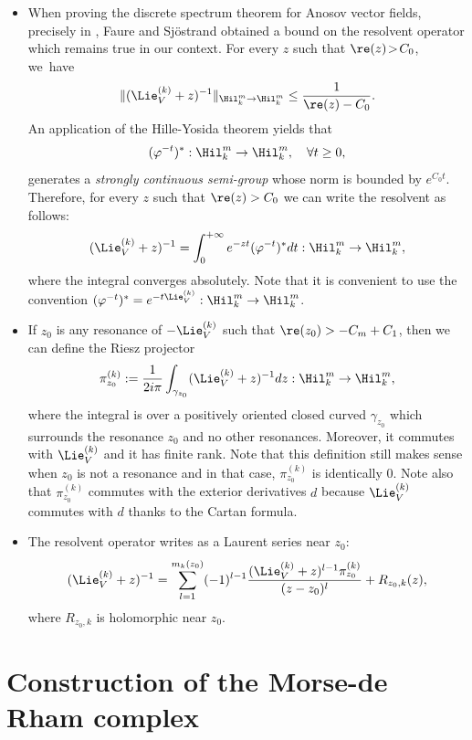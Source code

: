 \skpt
\begin{remark}
\begin{itemize}
\item When proving the discrete spectrum theorem for Anosov vector fields, precisely in \cite[Lem.\,3.3, p.\,343]{FS}, Faure and Sjöstrand obtained a bound on the resolvent operator which remains true in our context. For every $z$ such that \hbox{$\re (z) \!>\! C_0$}, we~have
\[
\| (\Lie_V^{(k)} + z)^{-1} \|_{\Hil_k^m \to \Hil_k^m} \leq \frac{1}{\re (z) - C_0}.
\]
An application of the Hille-Yosida theorem \cite[Cor.\,3.6, p.\,76]{engel-nagel} yields that
\[
(\varphi^{-t})^*: \Hil_k^m \to \Hil_k^m, \quad \forall t \geq 0,
\]
generates a \emph{strongly continuous semi-group} whose norm is bounded by $e^{C_0 t}$. Therefore, for every $z$ such that $\re (z) > C_0$ we can write the resolvent as follows:
\[
(\Lie_V^{(k)} + z)^{-1} = \int_0^{+\infty} e^{-zt } (\varphi^{-t})^* dt: \Hil_k^m \to \Hil_k^m,
\]
where the integral converges absolutely. Note that it is convenient to use the convention $(\varphi^{-t})^* = e^{-t \Lie_V^{(k)}}: \Hil_k^m \to \Hil_k^m$.
\item If $z_0 $ is any resonance of $-\Lie_V^{(k)}$ such that $\re (z_0) > -C_m + C_1$, then we can define the Riesz projector
\[
\pi_{z_0}^{(k)}:= \frac{1}{2 i \pi} \int_{\gamma_{z_0}} (\Lie_V^{(k)} + z)^{-1} dz: \Hil_k^m \to \Hil_k^m,
\]
where the integral is over a positively oriented closed curved $\gamma_{z_0}$ which surrounds the resonance $z_0$ and no other resonances. Moreover, it commutes with $\Lie_V^{(k)}$ and it has finite rank. Note that this definition still makes sense when $z_0$ is not a resonance and in that case, $\pi_{z_0}^{(k)}$ is identically $0$. Note also that $\pi_{z_0}^{(k)}$ commutes with the exterior derivatives $d$ because $\Lie_V^{(k)}$ commutes with $d$ thanks to the Cartan formula.
\Changel
\item The resolvent operator writes as a Laurent series near $z_0$:
\[
(\Lie_V^{(k)} + z)^{-1} = \sum_{l = 1}^{m_k (z_0)} (-1)^{l-1} \frac{(\Lie_V^{(k)} + z)^{l-1} \pi_{z_0}^{(k)}}{(z - z_0)^{l}} + R_{z_0,k} (z),
\]
where $R_{z_0,k}$ is holomorphic near $z_0$.
\end{itemize}
\Changelback
\end{remark}

\section{Construction of the Morse-de Rham complex} \label{section topology}

